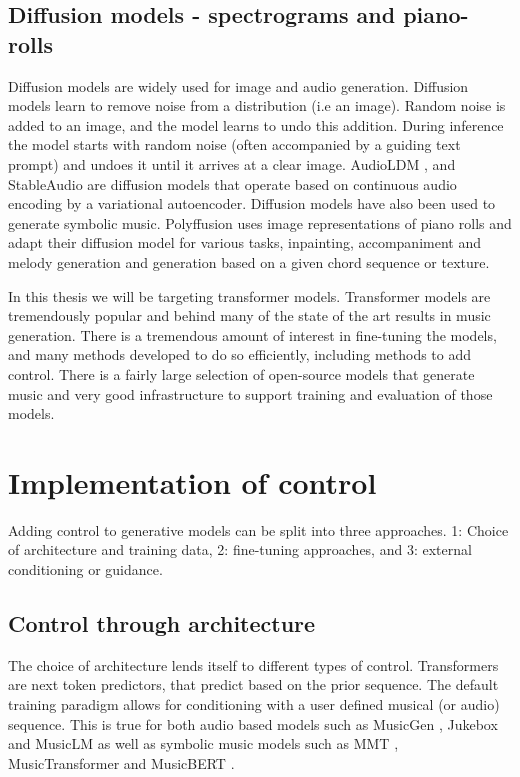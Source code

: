 \subsection{Diffusion models - spectrograms and piano-rolls}
Diffusion models are widely used for image and audio generation. Diffusion models learn to remove noise from a distribution (i.e an image). Random noise is added to an image, and the model learns to undo this addition. During inference the model starts with random noise (often accompanied by a guiding text prompt) and undoes it until it arrives at a clear image. AudioLDM \cite{Liu_Chen_Yuan_Mei_Liu_Mandic_Wang_Plumbley_2023}, and StableAudio \cite{Evans_Parker_Carr_Zukowski_Taylor_Pons_2024} are diffusion models that operate based on continuous audio encoding by a variational autoencoder. Diffusion models have also been used to generate symbolic music. Polyffusion \cite{Min_Jiang_Xia_Zhao_polyffusion_2023} uses image representations of piano rolls and adapt their diffusion model for various tasks, inpainting, accompaniment and melody generation and generation based on a given chord sequence or texture. 

In this thesis we will be targeting transformer models. Transformer models are tremendously popular and behind many of the state of the art results in music generation. There is a tremendous amount of interest in fine-tuning the models, and many methods developed to do so efficiently, including methods to add control. There is a fairly large selection of open-source models that generate music and very good infrastructure to support training and evaluation of those models. 

\section{Implementation of control} 
Adding control to generative models can be split into three approaches. 1: Choice of architecture and training data, 2: fine-tuning approaches, and 3: external conditioning or guidance.

\subsection{Control through architecture}
The choice of architecture lends itself to different types of control. Transformers are next token predictors, that predict based on the prior sequence. The default training paradigm allows for conditioning with a user defined musical (or audio) sequence. This is true for both audio based models such as MusicGen \cite{copet2023simple}, Jukebox \cite{Dhariwal_Jun_Payne_Kim_Radford_Sutskever_2020} and MusicLM \cite{Agostinelli_Denk_Borsos_Engel_Verzetti_Caillon_Huang_Jansen_Roberts_Tagliasacchi_et_al._2023} as well as symbolic music models such as MMT \cite{Dong_Chen_MMT_Kirkpatrick_2023}, MusicTransformer \cite{Huang_Vaswani_Uszkoreit_Shazeer_Simon_Hawthorne_Dai_Hoffman_Dinculescu_Eck_2018} and MusicBERT \cite{Zeng_Tan_Wang_MUSICBERT_2021}. 


